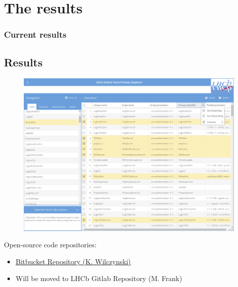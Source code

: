 \documentclass{beamer}
\begin{document}
\section{The results}
\begin{frame}
\frametitle{Current results}
\subsection{Results}
\begin{figure}[H]
    	\centering
    	\includegraphics[scale=0.15]{gui.png}
\end{figure}
\begin{block}{Open-source code repositories:}
\begin{itemize}
\item \underline{\href{https://bitbucket.org/3sztof/lhcb_online/src/master/}{Bitbucket Repository (K. Wilczynski)}} 
\item Will be moved to LHCb Gitlab Repository (M. Frank)
\end{itemize}
\end{block}
\end{frame}
\end{document}
